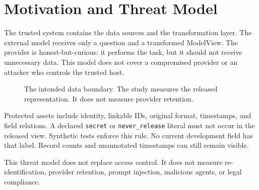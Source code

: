 \section{Motivation and Threat Model}
\label{sec:threat}
The trusted system contains the data sources and the transformation layer.
The external model receives only a question and a transformed ModelView.
The provider is honest-but-curious: it performs the task, but it should not
receive unnecessary data. This model does not cover a compromised provider or
an attacker who controls the trusted host.

\begin{figure}[H]
\centering
{}
\caption{The intended data boundary. The study measures the released
representation. It does not measure provider retention.}
\label{fig:architecture}
\end{figure}

Protected assets include identity, linkable IDs, original format, timestamps,
and field relations. A declared \texttt{secret} or \texttt{never\_release}
literal must not occur in the released view. Synthetic tests enforce this
rule. No current development field has that label. Record counts and
unannotated timestamps can still remain visible.

This threat model does not replace access control. It does not measure
re-identification, provider retention, prompt injection, malicious agents, or
legal compliance.
